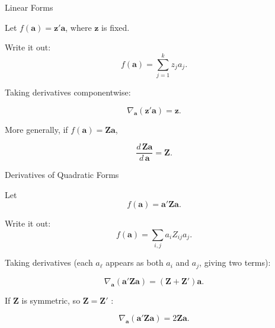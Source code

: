 \documentclass[aspectratio=169, handout, t]{beamer}
\numberwithin{equation}{section}
\begin{document}
\begin{frame}{Linear Forms}

Let $f(\bm{a}) = \bm{z}'\bm{a}$,
where $\bm{z}$ is fixed.

\vspace{0.3cm}

Write it out:
\[
f(\bm{a}) = \sum_{j=1}^k z_j a_j.
\]

\vspace{0.3cm}

Taking derivatives componentwise:\pause

\[
\nabla_{\bm{a}} (\bm{z}'\bm{a}) = \bm{z}.
\]

\vspace{0.5cm}\pause

More generally, if $f(\bm{a}) = \bm{Z}\bm{a}$,

\[
\dfrac{d\,\bm{Z}\bm{a}}{d\,\bm{a}} = \bm{Z}.
\]

\end{frame}

\begin{frame}{Derivatives of Quadratic Forms}

Let
\[
f(\bm{a}) = \bm{a}'\bm{Z}\bm{a}.
\]

\vspace{0.3cm}

Write it out:
\[
f(\bm{a}) = \sum_{i,j} a_i Z_{ij} a_j.
\]\pause

\vspace{0.4cm}

Taking derivatives (each $a_\ell$ appears as both $a_i$ and $a_j$, giving two terms):\pause

\[
\nabla_{\bm{a}} (\bm{a}'\bm{Z}\bm{a})
=
(\bm{Z} + \bm{Z}')\bm{a}.
\]

\vspace{0.3cm}\pause

If $\bm{Z}$ is symmetric, so $\bm{Z}=\bm{Z}'$ :

\[
\nabla_{\bm{a}} (\bm{a}'\bm{Z}\bm{a})
=
2\bm{Z}\bm{a}.
\]

\end{frame}
\end{document}
